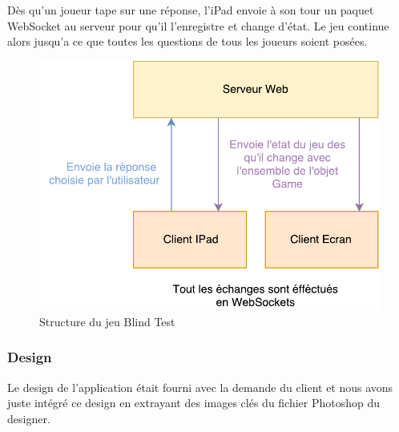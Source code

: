 \documentclass{article}
\begin{document}
Dès qu'un joueur tape sur une réponse, l'iPad envoie à son tour un paquet WebSocket au serveur pour qu'il l'enregistre et change d'état.
Le jeu continue alors jusqu'a ce que toutes les questions de tous les joueurs soient posées.

\begin{figure}[h]
    \centering
    \includegraphics{ah-blindtest.pdf}
    \caption{Structure du jeu Blind Test}
\end{figure}

\subsubsection{Design}

Le design de l'application était fourni avec la demande du client et nous avons juste intégré ce design en extrayant des images clés du fichier Photoshop du designer.
\end{document}

